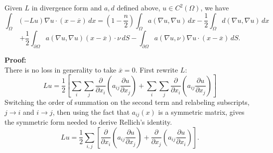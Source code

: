 \begin{lemma}[Rellich]
Given $L$ in divergence form and $a,d$ defined above, $u\in C^2
(\Omega )$, we have
\begin{equation}\label{rellich}
\int_{\Omega}(-Lu)\nabla u\cdot (x-\overline{x})\, dx
= (1-\frac{n}{2}) \int_{\Omega} a(\nabla u,\nabla u) \, dx
-
\frac{1}{2} \int_{\Omega}
d(\nabla u, \nabla u) \, dx
\end{equation}
$$
+
\frac{1}{2} \int_{\partial\Omega} a(\nabla u,\nabla u)(x-\overline{x})
\cdot \nu  \, dS
-
\int_{\partial\Omega}
a(\nabla u,\nu )\nabla u\cdot (x-\overline{x}) \, dS.
$$
\end{lemma}
{\bf Proof:}\\
There is no loss in generality to take $\overline{x} = 0$. First
rewrite $L$:
$$Lu = \frac{1}{2}\left[ \sum_{i}\sum_{j}
\frac{\partial}{\partial x_i}
\left( a_{ij} \frac{\partial u}{\partial x_j} \right) +
\sum_{i}\sum_{j}
\frac{\partial}{\partial x_i}
\left( a_{ij} \frac{\partial u}{\partial x_j} \right)
\right]$$
Switching the order of summation on the second term and relabeling
subscripts, $j \rightarrow i$ and $i \rightarrow j$, then using the fact
that $a_{ij}(x)$ is a symmetric matrix,
gives the symmetric form needed to derive Rellich's identity.
\begin{equation}
Lu = \frac{1}{2} \sum_{i,j}\left[
\frac{\partial}{\partial x_i}
\left( a_{ij} \frac{\partial u}{\partial x_j} \right) +
\frac{\partial}{\partial x_j}
\left( a_{ij} \frac{\partial u}{\partial x_i} \right)
\right].
\end{equation}

